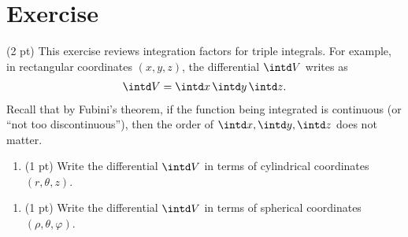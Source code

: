 \section{Exercise}

(2 pt) This exercise reviews integration factors for triple integrals. For example, in rectangular coordinates $(x,y,z)$, the differential $\intd V$ writes as
\begin{align*}
\intd V
=
\intd x \, \intd y \, \intd z.
\end{align*}
Recall that by Fubini's theorem, if the function being integrated is continuous (or ``not too discontinuous''), then the order of $\intd x,\intd y,\intd z$ does not matter.

\begin{enumerate}[label=(\alph*)]
\item (1 pt) Write the differential $\intd V$ in terms of cylindrical coordinates $(r,\theta,z)$.
\end{enumerate}


\begin{enumerate}[label=(\alph*)]
\item (1 pt) Write the differential $\intd V$ in terms of spherical coordinates $(\rho,\theta,\varphi)$.
\end{enumerate}

